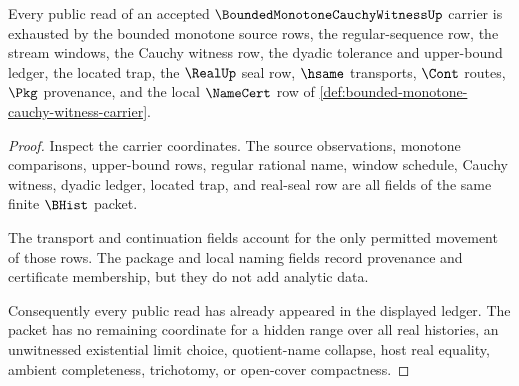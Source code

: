 \begin{theorem}
\label{thm:bounded-monotone-cauchy-witness-ledger-exhaustion}
Every public read of an accepted $\BoundedMonotoneCauchyWitnessUp$ carrier is exhausted by the bounded monotone source rows, the regular-sequence row, the stream windows, the Cauchy witness row, the dyadic tolerance and upper-bound ledger, the located trap, the $\RealUp$ seal row, $\hsame$ transports, $\Cont$ routes, $\Pkg$ provenance, and the local $\NameCert$ row of \autoref{def:bounded-monotone-cauchy-witness-carrier}.
\end{theorem}
\begin{proof}
Inspect the carrier coordinates. The source observations, monotone comparisons, upper-bound rows, regular rational name, window schedule, Cauchy witness, dyadic ledger, located trap, and real-seal row are all fields of the same finite $\BHist$ packet.

The transport and continuation fields account for the only permitted movement of those rows. The package and local naming fields record provenance and certificate membership, but they do not add analytic data.

Consequently every public read has already appeared in the displayed ledger. The packet has no remaining coordinate for a hidden range over all real histories, an unwitnessed existential limit choice, quotient-name collapse, host real equality, ambient completeness, trichotomy, or open-cover compactness.
\end{proof}

